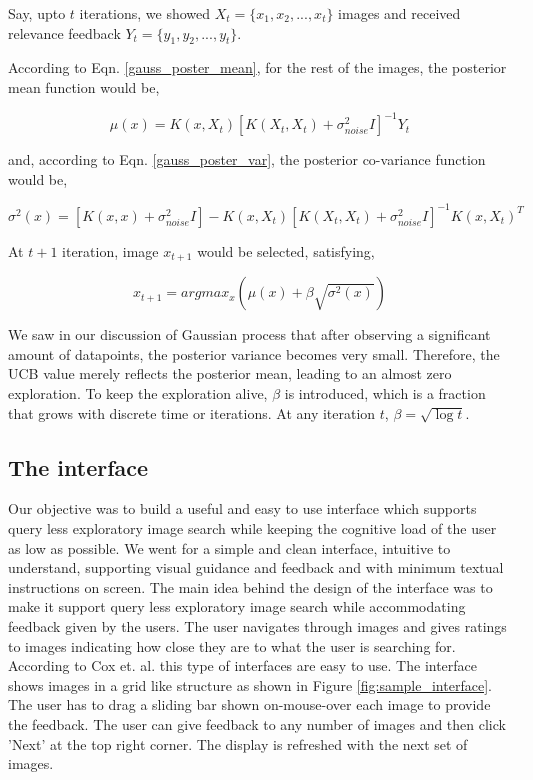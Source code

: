 \documentclass[english]{tktltiki}
\begin{document}
Say, upto $t$ iterations, we showed $X_t = \{x_1, x_2, ..., x_t\}$ images and received relevance feedback $Y_t = \{y_1, y_2, ..., y_t\}$.

According to Eqn. \ref{gauss_poster_mean}, for the rest of the images, the posterior mean function would be,

\begin{equation}
\mu(x) = K(x, X_t)[K(X_t, X_t) + \sigma_{noise}^2I]^{-1}Y_t
\end{equation}

and, according to Eqn. \ref{gauss_poster_var}, the posterior co-variance function would be,

\begin{equation}
\sigma^2(x) = [K(x, x) + \sigma_{noise}^2I] - K(x, X_t)[K(X_t, X_t) + \sigma_{noise}^2I]^{-1}K(x, X_t)^T
\end{equation}

At $t+1$ iteration, image $x_{t+1}$ would be selected, satisfying,

\begin{equation}
x_{t+1} = argmax_x(\mu(x) + \beta\sqrt{\sigma^2(x)})
\end{equation}

We saw in our discussion of Gaussian process that after observing a significant amount of datapoints, the posterior variance becomes very small. Therefore, the UCB value merely reflects the posterior mean, leading to an almost zero exploration. To keep the exploration alive, $\beta$ is introduced, which is a fraction that grows with discrete time or iterations. At any iteration $t$, $\beta = \sqrt{\log t}$.

\subsection{The interface}

Our objective was to build a useful and easy to use interface which supports query less exploratory image search \cite{pichunter, PicSOM, iter_rel_feed} while keeping the cognitive load of the user as low as possible. We went for a simple and clean interface, intuitive to understand, supporting visual guidance and feedback and with minimum textual instructions on screen. The main idea behind the design of the interface was to make it support query less exploratory image search while accommodating feedback given by the users. The user navigates through images and gives ratings to images indicating how close they are to what the user is searching for. According to Cox et. al. \cite{pichunter} this type of interfaces are easy to use. The interface shows images in a grid like structure as shown in Figure \ref{fig:sample_interface}. The user has to drag a sliding bar shown on-mouse-over each image to provide the feedback. The user can give feedback to any number of images and then click 'Next' at the top right corner. The display is refreshed with the next set of images.
\end{document}
